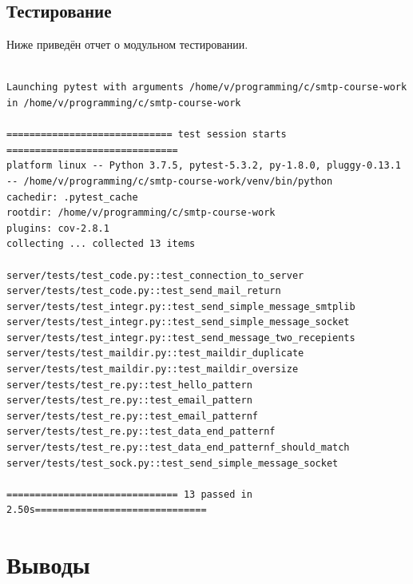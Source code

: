 \documentclass[a4paper,12pt]{report}
\begin{document}
\vspace{100mm}

\section{Тестирование}

Ниже приведён отчет о модульном тестировании.

\begin{verbatim}

Launching pytest with arguments /home/v/programming/c/smtp-course-work in /home/v/programming/c/smtp-course-work

============================= test session starts ==============================
platform linux -- Python 3.7.5, pytest-5.3.2, py-1.8.0, pluggy-0.13.1 -- /home/v/programming/c/smtp-course-work/venv/bin/python
cachedir: .pytest_cache
rootdir: /home/v/programming/c/smtp-course-work
plugins: cov-2.8.1
collecting ... collected 13 items

server/tests/test_code.py::test_connection_to_server 
server/tests/test_code.py::test_send_mail_return 
server/tests/test_integr.py::test_send_simple_message_smtplib 
server/tests/test_integr.py::test_send_simple_message_socket 
server/tests/test_integr.py::test_send_message_two_recepients 
server/tests/test_maildir.py::test_maildir_duplicate 
server/tests/test_maildir.py::test_maildir_oversize 
server/tests/test_re.py::test_hello_pattern 
server/tests/test_re.py::test_email_pattern 
server/tests/test_re.py::test_email_patternf 
server/tests/test_re.py::test_data_end_patternf 
server/tests/test_re.py::test_data_end_patternf_should_match 
server/tests/test_sock.py::test_send_simple_message_socket 

============================== 13 passed in 2.50s==============================

\end{verbatim}
\chapter*{Выводы}
\end{document}
